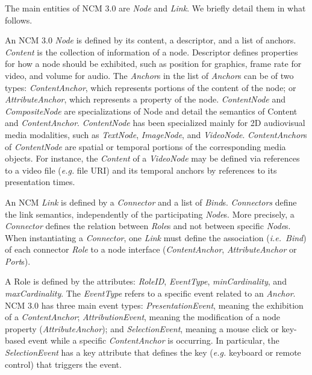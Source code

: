 \documentclass[
  doutorado,
  american
]{ThesisPUC}
\begin{document}
The main entities of NCM 3.0 are \textit{Node} and \textit{Link}. We briefly
detail them in what follows. 

An NCM 3.0 \textit{Node} is defined by its content, a descriptor, and a list of
anchors. 
\textit{Content} is the collection of information of a node. Descriptor defines
properties for how a node should be exhibited, such as position for graphics,
frame rate for video, and volume for audio. The \textit{Anchor}s in the list of 
\textit{Anchor}s
can be of two types: \textit{ContentAnchor}, which represents portions of the
content of the node; or \textit{AttributeAnchor}, which represents a property of
the node. 
\textit{ContentNode} and \textit{CompositeNode} are specializations of Node and
detail the semantics of Content and \textit{ContentAnchor}. \textit{ContentNode}
has been specialized mainly for 2D audiovisual media modalities, such as
\textit{TextNode}, \textit{ImageNode}, and \textit{VideoNode}. 
\textit{ContentAnchor}s of \textit{ContentNode} are spatial or temporal 
portions of the corresponding media objects. For instance, the \textit{Content} 
of a \textit{VideoNode} may be defined via references to a video file 
(\textit{e.g.} file URI) and its temporal anchors by references to 
its presentation times.

An NCM \textit{Link} is defined by a \textit{Connector} and a list of 
\textit{Bind}s. 
\textit{Connectors} define the link semantics, independently of the 
participating \textit{Node}s.
More precisely, a \textit{Connector} defines the relation between 
\textit{Role}s and not between specific \textit{Node}s. When instantiating a 
\textit{Connector}, one \textit{Link} must define the association 
(\textit{i.e.}~\textit{Bind}) of each connector \textit{Role} to 
a node interface (\textit{ContentAnchor}, \textit{AttributeAnchor} or 
\textit{Port}s).

A Role is defined by the attributes: \textit{RoleID}, \textit{EventType}, 
\textit{minCardinality}, and 
\textit{maxCardinality}. The \textit{EventType} refers to a specific event
related to an \textit{Anchor}. NCM 3.0 has three main event types:
\textit{PresentationEvent}, meaning the exhibition of a \textit{ContentAnchor};
\textit{AttributionEvent}, meaning the modification of a node property
(\textit{AttributeAnchor}); and \textit{SelectionEvent}, meaning a mouse click
or key-based event while a specific \textit{ContentAnchor} is occurring. In
particular, the \textit{SelectionEvent} has a key attribute that defines the 
key (\textit{e.g.} keyboard or remote control) that triggers the event.
\end{document}

